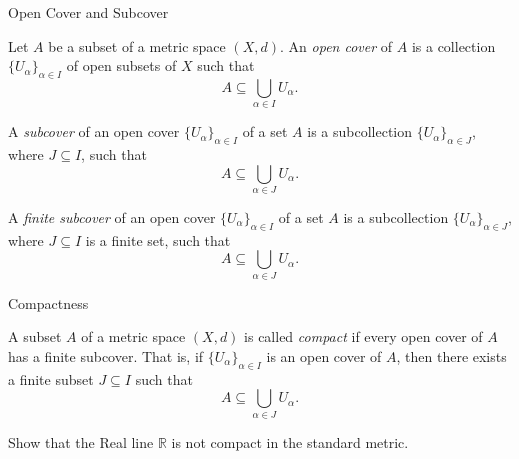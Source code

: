 \documentclass[12pt, a4paper]{article}
\begin{document}
\FrontPage
\Large

\begin{heading}
    Open Cover and Subcover
\end{heading}

\vspace{10pt}

\begin{definition}
    Let $A$ be a subset of a metric space $(X, d)$. An \textit{open cover} of $A$ is a collection $\{U_\alpha\}_{\alpha \in I}$ of open subsets of $X$ such that
    \[
        A \subseteq \bigcup_{\alpha \in I} U_\alpha.
    \]
\end{definition}

\clearpage

\begin{definition}[Subcover]
    A \textit{subcover} of an open cover $\{U_\alpha\}_{\alpha \in I}$ of a set $A$ is a subcollection $\{U_\alpha\}_{\alpha \in J}$, where $J \subseteq I$, such that
    \[
        A \subseteq \bigcup_{\alpha \in J} U_\alpha.
    \]
\end{definition}

\clearpage

\begin{definition}
    A \textit{finite subcover} of an open cover $\{U_\alpha\}_{\alpha \in I}$ of a set $A$ is a subcollection $\{U_\alpha\}_{\alpha \in J}$, where $J \subseteq I$ is a finite set, such that
    \[
        A \subseteq \bigcup_{\alpha \in J} U_\alpha.
    \]
\end{definition}

\clearpage

\begin{heading}
    Compactness
\end{heading}

\begin{definition}[Compactness]
    A subset $A$ of a metric space $(X, d)$ is called \textit{compact} if every open cover of $A$ has a finite subcover. That is, if $\{U_\alpha\}_{\alpha \in I}$ is an open cover of $A$, then there exists a finite subset $J \subseteq I$ such that
    \[
        A \subseteq \bigcup_{\alpha \in J} U_\alpha.
    \]
\end{definition}

\clearpage

\begin{problem}
    Show that the Real line $\mathbb{R}$ is not compact in the standard metric.
\end{problem}
\end{document}
